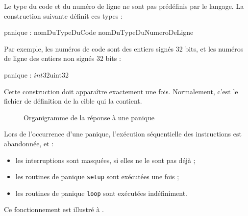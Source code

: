 Le type du code et du numéro de ligne ne sont pas prédéfinis par le langage. La construction suivante définit ces types :
\begin{PLM}
panique : nomDuTypeDuCode nomDuTypeDuNumeroDeLigne
\end{PLM}

Par exemple, les numéros de code sont des entiers signés 32 bits, et les numéros de ligne des entiers non signés 32 bits :
\begin{PLM}
panique : $int32 $uint32
\end{PLM}

Cette construction doit apparaître exactement une fois. Normalement, c'est le fichier de définition de la cible qui la contient.



\begin{figure}[t]
  \centering
  \small
  \caption{Organigramme de la réponse à une panique}
  \ligne
\end{figure}

Lors de l'occurrence d'une panique, l'exécution séquentielle des instructions est abandonnée, et :
\begin{itemize}
  \item les interruptions sont masquées, si elles ne le sont pas déjà ;
  \item les routines de panique \texttt{setup} sont exécutées une fois ;
  \item les routines de panique \texttt{loop} sont exécutées indéfiniment.
\end{itemize}
Ce fonctionnement est illustré à .

